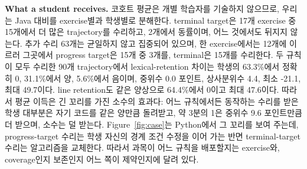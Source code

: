 \documentclass[10pt,conference]{IEEEtran}
\begin{document}
\noindent\textbf{What a student receives.} 코호트 평균은 개별 학습자를 기술하지 않으므로, 우리는 Java 대비를 exercise별과 학생별로 분해한다. terminal target은 17개 exercise 중 15개에서 더 많은 trajectory를 수리하고, 2개에서 동률이며, 어느 것에서도 뒤지지 않는다. 추가 수리 63개는 균일하지 않고 집중되어 있으며, 한 exercise에서는 12개에 이르러 그곳에서 progress target은 15개 중 3개를, terminal은 15개를 수리한다. 두 규칙이 모두 수리한 90개 trajectory에서 lexical-retention 차이는 학생의 63.3\%에서 정확히 0, 31.1\%에서 양, 5.6\%에서 음이며, 중위수 0.0 포인트, 상사분위수 4.4, 최소 -21.1, 최대 49.7이다. line retention도 같은 양상으로 64.4\%에서 0이고 최대 47.6이다. 따라서 평균 이득은 긴 꼬리를 가진 소수의 효과다: 어느 규칙에서든 동작하는 수리를 받은 학생 대부분은 자기 코드를 같은 양만큼 돌려받고, 약 3분의 1은 중위수 9.6 포인트만큼 더 받으며, 소수는 덜 받는다. Figure~\ref{fig:case}는 Python에서 그 꼬리를 보여 주는데, progress-target 수리는 학생 자신의 경계 조건 수정을 이어 가는 반면 terminal-target 수리는 알고리즘을 교체한다. 따라서 과목이 어느 규칙을 배포할지는 exercise와, coverage인지 보존인지 어느 쪽이 제약인지에 달려 있다.
\end{document}
